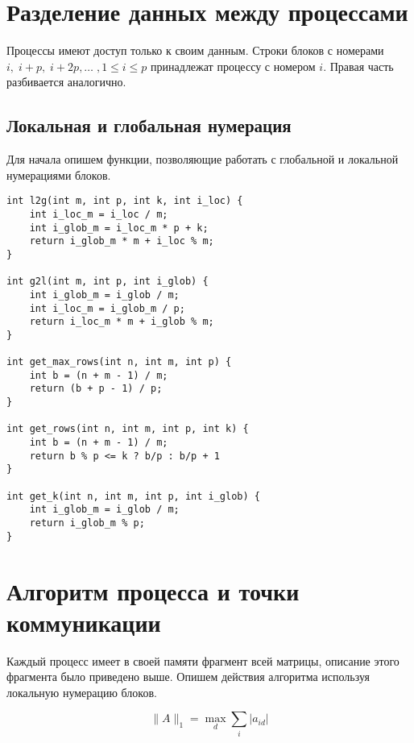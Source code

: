 \documentclass[12pt]{article} %
\begin{document}
\section{Разделение данных между процессами}
Процессы имеют доступ только к своим данным. Строки блоков с номерами $i,\; i+p,\; i+2p,\ldots\;, 1 \leqslant i \leqslant p$ принадлежат процессу с номером $i$. Правая часть разбивается аналогично.

\subsection{Локальная и глобальная нумерация}
Для начала опишем функции, позволяющие работать с глобальной и локальной нумерациями блоков.

\begin{lstlisting}
int l2g(int m, int p, int k, int i_loc) {
    int i_loc_m = i_loc / m;
    int i_glob_m = i_loc_m * p + k;
    return i_glob_m * m + i_loc % m;
}

int g2l(int m, int p, int i_glob) {
    int i_glob_m = i_glob / m;
    int i_loc_m = i_glob_m / p;
    return i_loc_m * m + i_glob % m;
}

int get_max_rows(int n, int m, int p) {
    int b = (n + m - 1) / m;
    return (b + p - 1) / p;
}

int get_rows(int n, int m, int p, int k) {
    int b = (n + m - 1) / m;
    return b % p <= k ? b/p : b/p + 1
}

int get_k(int n, int m, int p, int i_glob) {
    int i_glob_m = i_glob / m;
    return i_glob_m % p;
}

\end{lstlisting}

\section{Алгоритм процесса и точки коммуникации}
Каждый процесс имеет в своей памяти фрагмент всей матрицы, описание этого фрагмента было приведено выше. Опишем действия алгоритма используя локальную нумерацию блоков.

$$\lVert A \rVert _1 = \underset{d} \max \sum \limits_{i} |a_{id}|$$
\end{document}
